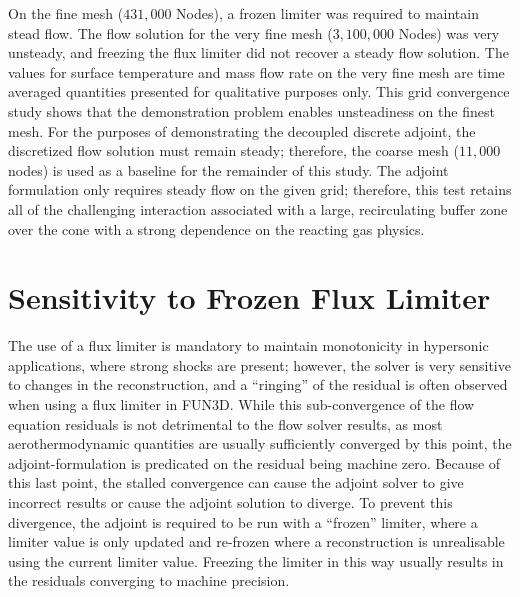 On the fine mesh ($431,000$ Nodes), a frozen limiter was required to maintain
stead flow.  The flow solution for the very fine mesh ($3,100,000$ Nodes) was
very unsteady, and freezing the flux limiter did not recover a steady flow
solution.  The values for surface temperature and mass flow rate on the very
fine mesh are time averaged quantities presented for qualitative purposes only.
This grid convergence study shows that the demonstration problem enables
unsteadiness on the finest mesh.  For the purposes of demonstrating the
decoupled discrete adjoint, the discretized flow solution must remain steady;
therefore, the coarse mesh ($11,000$ nodes) is used as a baseline for the
remainder of this study.  The adjoint formulation only requires steady flow on
the given grid; therefore, this test retains all of the challenging interaction
associated with a large, recirculating buffer zone over the cone with a strong
dependence on the reacting gas physics.

\section{Sensitivity to Frozen Flux Limiter}
\label{sec:frozen-limiter}

The use of a flux limiter is mandatory to maintain monotonicity in hypersonic
applications, where strong shocks are present; however, the solver is very
sensitive to changes in the reconstruction, and a ``ringing'' of the residual is
often observed\cite{gnoffo2007ringing} when using a flux limiter in FUN3D. While
this sub-convergence of the flow equation residuals is not detrimental to the
flow solver results, as most aerothermodynamic quantities are usually
sufficiently converged by this point, the adjoint-formulation is predicated on
the residual being machine zero.  Because of this last point, the stalled
convergence can cause the adjoint solver to give incorrect results or cause the
adjoint solution to diverge.  To prevent this divergence, the adjoint is
required to be run with a ``frozen'' limiter, where a limiter value is only
updated and re-frozen where a reconstruction is unrealisable using the current
limiter value.  Freezing the limiter in this way usually results in the
residuals converging to machine precision.

